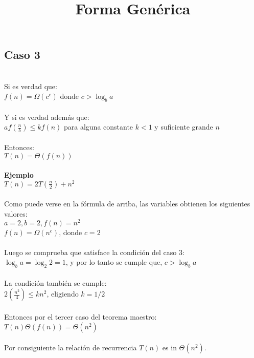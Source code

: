 \documentclass{article}
\begin{document}
\subsection{Caso 3}
\title{\textbf{Forma Genérica}}\\
Si es verdad que:\\

$f(n)=\Omega(c^{c})$ donde $c>\log_{b}{a}$\\\\
Y si es verdad además que:\\

$af(\frac{n}{b})\leq kf(n)$ para alguna constante $k<1$ y suficiente grande $n$\\\\
Entonces: \\

$T(n)=\Theta(f(n))$\\\\
\textbf{Ejemplo}\\

$T(n)=2T(\frac{n}{2})+n^2$\\\\
Como puede verse en la fórmula de arriba, las variables obtienen los siguientes valores:\\

$a=2, b=2, f(n)=n^2$\\

$f(n)=\Omega(n^c)$, donde $c=2$\\\\
Luego se comprueba que satisface la condición del caso 3:\\

$\log_{b}{a}=\log_{2}{2}=1$, y por lo tanto se cumple que, $c>\log_{b}{a}$\\\\
La condición también se cumple:\\

$2(\frac{n^2}{4})\leq kn^2$, eligiendo $k=1/2$\\\\
Entonces por el tercer caso del teorema maestro:\\

$T(n)\Theta(f(n))=\Theta(n^2)$\\\\
Por consiguiente la relación de recurrencia $T(n)$ es in $\Theta(n^2).$\\
\end{document}
